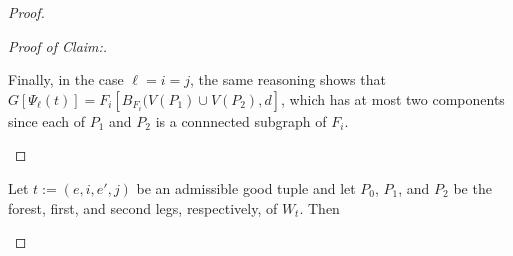 \documentclass{patmorin}
\newenvironment{clmproof}{\begin{proof}[Proof of Claim:]\renewcommand{\qedsymbol}{\rule{1ex}{1ex}}}{\end{proof}}
\DeclareMathOperator{\dist}{dist}
\begin{document}
\begin{proof}
\begin{clmproof}
\begin{enumerate}[(i)]
    Finally, in the case $\ell=i=j$, the same reasoning shows that $G[\Psi_\ell(t)]=F_i[B_{F_i}(V(P_1)\cup V(P_2),d]$, which has at most two components since each of $P_1$ and $P_2$ is a connnected subgraph of $F_i$. \qedhere
  \end{enumerate}
\end{clmproof}

%
%

\begin{clm}\label{overlap}
  Let $t:=(e,i,e',j)$ be an admissible good tuple and let $P_0$, $P_1$, and $P_2$ be the forest, first, and second legs, respectively, of $W_t$.  Then
\end{clm}


\end{proof}
\end{document}
